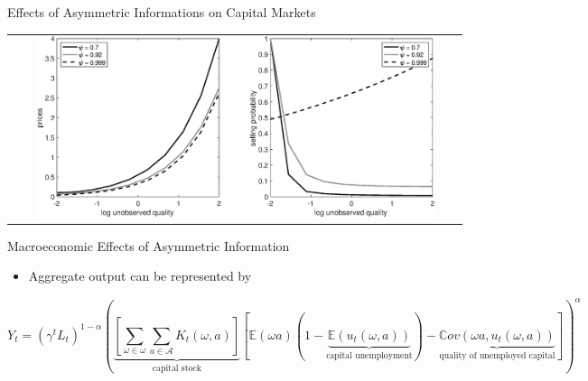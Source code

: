 \documentclass[english,xcolor=svgnames,aspectratio=169]{beamer}
\begin{document}
\begin{frame}{Effects of Asymmetric Informations on Capital Markets}
\begin{table}
\scriptsize
\begin{tabular}{c}
\includegraphics[width=0.9\textwidth]{figures/fig_policy_functions.eps}
\end{tabular}
\end{table}
\vspace{-0.5cm}
\end{frame}

\begin{frame}{Macroeconomic Effects of Asymmetric Information}\label{app:macro_implications_ai}

\begin{itemize}
\item Aggregate output can be represented by
\end{itemize}

{\footnotesize\begin{equation*}
Y_t = \left(\gamma^t L_t\right)^{1-\alpha}\left(\underbrace{\left[\sum_{\omega\in\omega}\sum_{a\in\mathcal{A}}K_{t}(\omega,a)\right]}_{\text{capital stock}}\left[\mathbb{E}\left(\omega a\right)\left(1-\underbrace{\mathbb{E}\left(u_{t}(\omega,a)\right)}_{\text{capital unemployment}}\right)-\underbrace{\mathbb{C}ov\left(\omega a,u_{t}(\omega,a)\right)}_{\text{quality of unemployed capital}}\right]\right)^{\alpha}
\end{equation*}}
\end{frame}
\end{document}

